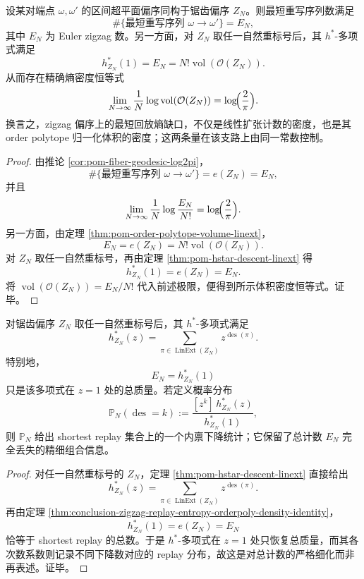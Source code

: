 \begin{theorem}\label{thm:conclusion-zigzag-replay-entropy-orderpoly-density-identity}
设某对端点 \(\omega,\omega'\) 的区间超平面偏序同构于锯齿偏序 \(Z_N\)。则最短重写序列数满足
\[
\#\{\text{最短重写序列 }\omega\to\omega'\}=E_N,
\]
其中 \(E_N\) 为 Euler zigzag 数。另一方面，对 \(Z_N\) 取任一自然重标号后，其 \(h^\ast\)-多项式满足
\[
h_{Z_N}^\ast(1)=E_N=N!\operatorname{vol}(\mathcal O(Z_N)).
\]
从而存在精确熵密度恒等式
\[
\lim_{N\to\infty}\frac{1}{N}\log \operatorname{vol}(\mathcal O(Z_N))
=
\log\!\Bigl(\frac{2}{\pi}\Bigr).
\]
换言之，zigzag 偏序上的最短回放熵缺口，不仅是线性扩张计数的密度，也是其 order polytope 归一化体积的密度；这两条量在该支路上由同一常数控制。
\end{theorem}
\begin{proof}
由推论 \ref{cor:pom-fiber-geodesic-log2pi}，
\[
\#\{\text{最短重写序列 }\omega\to\omega'\}=e(Z_N)=E_N,
\]
并且
\[
\lim_{N\to\infty}\frac{1}{N}\log\frac{E_N}{N!}
=
\log\!\Bigl(\frac{2}{\pi}\Bigr).
\]
另一方面，由定理 \ref{thm:pom-order-polytope-volume-linext}，
\[
E_N=e(Z_N)=N!\operatorname{vol}(\mathcal O(Z_N)).
\]
对 \(Z_N\) 取任一自然重标号，再由定理 \ref{thm:pom-hstar-descent-linext} 得
\[
h_{Z_N}^\ast(1)=e(Z_N)=E_N.
\]
将
\(
\operatorname{vol}(\mathcal O(Z_N))=E_N/N!
\)
代入前述极限，便得到所示体积密度恒等式。证毕。
\end{proof}

\begin{theorem}\label{thm:conclusion-zigzag-hstar-strict-refinement-of-replay-count}
对锯齿偏序 \(Z_N\) 取任一自然重标号后，其 \(h^\ast\)-多项式满足
\[
h_{Z_N}^\ast(z)=\sum_{\pi\in\operatorname{LinExt}(Z_N)} z^{\operatorname{des}(\pi)}.
\]
特别地，
\[
E_N=h_{Z_N}^\ast(1)
\]
只是该多项式在 \(z=1\) 处的总质量。若定义概率分布
\[
\mathbb P_N(\operatorname{des}=k):=
\frac{[z^k]\,h_{Z_N}^\ast(z)}{h_{Z_N}^\ast(1)},
\]
则 \(\mathbb P_N\) 给出 shortest replay 集合上的一个内禀下降统计；它保留了总计数 \(E_N\) 完全丢失的精细组合信息。
\end{theorem}
\begin{proof}
对任一自然重标号的 \(Z_N\)，定理 \ref{thm:pom-hstar-descent-linext} 直接给出
\[
h_{Z_N}^\ast(z)=\sum_{\pi\in\operatorname{LinExt}(Z_N)} z^{\operatorname{des}(\pi)}.
\]
再由定理 \ref{thm:conclusion-zigzag-replay-entropy-orderpoly-density-identity}，
\[
h_{Z_N}^\ast(1)=e(Z_N)=E_N
\]
恰等于 shortest replay 的总数。于是 \(h^\ast\)-多项式在 \(z=1\) 处只恢复总质量，而其各次数系数则记录不同下降数对应的 replay 分布，故这是对总计数的严格细化而非再表述。证毕。
\end{proof}

